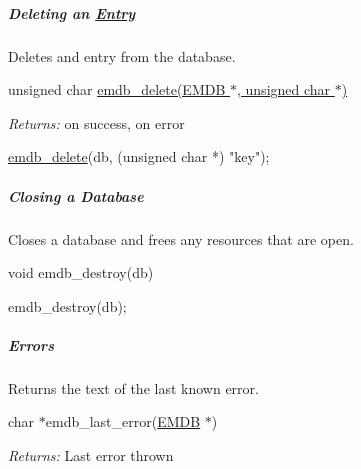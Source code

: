 \subparagraph*{Deleting an \hyperlink{struct_entry}{Entry}}

Deletes and entry from the database.

{\ttfamily unsigned char \hyperlink{emdb_8h_ad3579dc6616286a680dfff12e591979e}{emdb\+\_\+delete(\+E\+M\+D\+B $\ast$, unsigned char $\ast$)}}

{\itshape Returns\+:} {} on success, {} on error


\begin{DoxyCode}
\hyperlink{emdb_8h_ad3579dc6616286a680dfff12e591979e}{emdb\_delete}(db, (\textcolor{keywordtype}{unsigned} \textcolor{keywordtype}{char} *) \textcolor{stringliteral}{"key"});
\end{DoxyCode}


\subparagraph*{Closing a Database}

Closes a database and frees any resources that are open.

{\ttfamily void emdb\+\_\+destroy(db)}


\begin{DoxyCode}
emdb\_destroy(db);
\end{DoxyCode}


\subparagraph*{Errors}

Returns the text of the last known error.

{\ttfamily char $\ast$emdb\+\_\+last\+\_\+error(\hyperlink{struct_e_m_d_b}{E\+M\+D\+B} $\ast$)}

{\itshape Returns\+:} Last error thrown


 